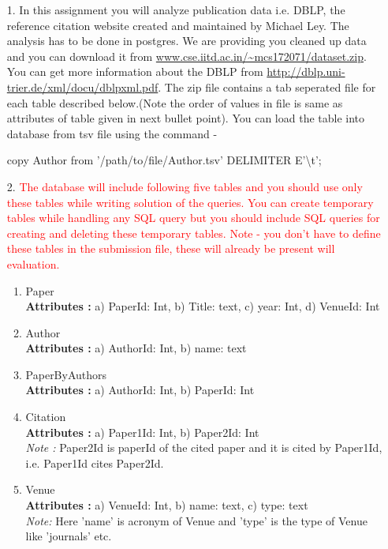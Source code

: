 \documentclass[10pt]{article}
\begin{document}
\begin{itemize}

\item[1.] In this assignment you will analyze publication data i.e. DBLP, the reference citation website created and maintained by Michael Ley. The analysis has to  be done in postgres. We are providing you cleaned up data and you can download it from  \url{www.cse.iitd.ac.in/~mcs172071/dataset.zip}. You can get more information about the DBLP from \url{http://dblp.uni-trier.de/xml/docu/dblpxml.pdf}. The zip file contains a tab seperated file for each table described below.(Note the order of values in file is same as attributes of table given in next bullet point). You can load the table into database from tsv file using the command - 

copy Author from '/path/to/file/Author.tsv' DELIMITER E'\textbackslash t';

\item[2.] \textcolor{red}{The database will include following five tables and you should use only these tables while writing solution of the queries. You can create temporary tables while handling any SQL query but you should include SQL queries for creating and deleting these temporary tables. Note - you don't have to define these tables in the submission file, these will already be present will evaluation.}

\begin{enumerate}
\item Paper\\
	\textbf{Attributes :}  a) PaperId: Int, b) Title: text, c) year: Int, d) VenueId: Int
\item Author\\
	\textbf{Attributes :} a) AuthorId: Int, b) name: text
	
\item PaperByAuthors\\
	\textbf{Attributes :} a) AuthorId: Int, b) PaperId: Int
	
\item Citation\\
	\textbf{Attributes :} a) Paper1Id: Int, b) Paper2Id: Int\\
\emph{Note :} Paper2Id is paperId of the cited paper and it is cited by Paper1Id, i.e. Paper1Id cites Paper2Id.

\item Venue\\
	\textbf{Attributes :} a) VenueId: Int, b) name: text, c) type: text\\
\emph{Note:} Here 'name' is acronym of Venue and 'type' is the type of Venue like 'journals' etc. 
\end{enumerate}

\end{itemize}
\end{document}
